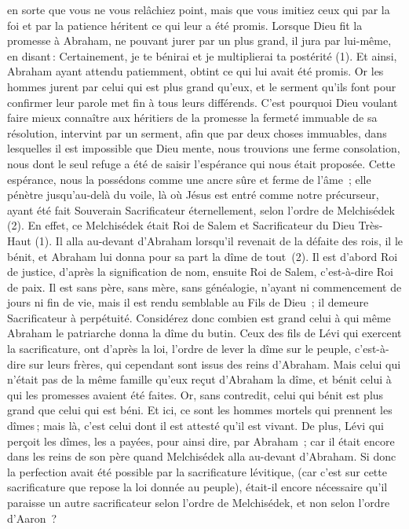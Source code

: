 \begin{multicols}{2}
en sorte que vous ne vous relâchiez point, mais que vous imitiez ceux qui par la foi et par la patience héritent ce qui leur a été promis.
Lorsque Dieu fit la promesse à Abraham, ne pouvant jurer par un plus grand, il jura par lui-même,
en disant : Certainement, je te bénirai et je multiplierai ta postérité (1).
Et ainsi, Abraham ayant attendu patiemment, obtint ce qui lui avait été promis.
Or les hommes jurent par celui qui est plus grand qu'eux, et le serment qu'ils font pour confirmer leur parole met fin à tous leurs différends.
C'est pourquoi Dieu voulant faire mieux connaître aux héritiers de la promesse la fermeté immuable de sa résolution, intervint par un serment,
afin que par deux choses immuables, dans lesquelles il est impossible que Dieu mente, nous trouvions une ferme consolation, nous dont le seul refuge a été de saisir l'espérance qui nous était proposée.
Cette espérance, nous la possédons comme une ancre sûre et ferme de l'âme ; elle pénètre jusqu'au-delà du voile,
là où Jésus est entré comme notre précurseur, ayant été fait Souverain Sacrificateur éternellement, selon l'ordre de Melchisédek (2).
\VerseOne{}En effet, ce Melchisédek était Roi de Salem et Sacrificateur du Dieu Très-Haut (1). Il alla au-devant d'Abraham lorsqu'il revenait de la défaite des rois, il le bénit,
et Abraham lui donna pour sa part la dîme de tout (2). Il est d’abord Roi de justice, d’après la signification de nom, ensuite Roi de Salem, c’est-à-dire Roi de paix.
Il est sans père, sans mère, sans généalogie, n'ayant ni commencement de jours ni fin de vie, mais il est rendu semblable au Fils de Dieu ; il demeure Sacrificateur à perpétuité.
Considérez donc combien est grand celui à qui même Abraham le patriarche donna la dîme du butin.
Ceux des fils de Lévi qui exercent la sacrificature, ont d’après la loi, l’ordre de lever la dîme sur le peuple, c'est-à-dire sur leurs frères, qui cependant sont issus des reins d'Abraham.
Mais celui qui n’était pas de la même famille qu’eux reçut d’Abraham la dîme, et bénit celui à qui les promesses avaient été faites.
Or, sans contredit, celui qui bénit est plus grand que celui qui est béni.
Et ici, ce sont les hommes mortels qui prennent les dîmes ; mais là, c’est celui dont il est attesté qu’il est vivant.
De plus, Lévi qui perçoit les dîmes, les a payées, pour ainsi dire, par Abraham ;
car il était encore dans les reins de son père quand Melchisédek alla au-devant d’Abraham.
Si donc la perfection avait été possible par la sacrificature lévitique, (car c'est sur cette sacrificature que repose la loi donnée au peuple), était-il encore nécessaire qu’il paraisse un autre sacrificateur selon l'ordre de Melchisédek, et non selon l'ordre d'Aaron ?

\end{multicols}
